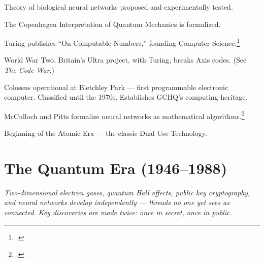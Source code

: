 \begin{description}[style=nextline, leftmargin=3.5cm, labelwidth=3cm]

\item[1873--98] Theory of biological neural networks proposed and experimentally tested.

\item[1924--1927] The Copenhagen Interpretation of Quantum Mechanics is formalized.

\item[1936] Turing publishes ``On Computable Numbers,'' founding Computer Science.\footcite{turing1936}

\item[1939--1945] World War Two. Britain's Ultra project, with Turing, breaks Axis codes. (See \textit{The Code War}.)

\item[1943] Colossus operational at Bletchley Park --- first programmable electronic computer. Classified until the 1970s. Establishes GCHQ's computing heritage.

\item[1943] McCulloch and Pitts formalize neural networks as mathematical algorithms.\footcite{mccullochpitts1943}

\item[1945] Beginning of the Atomic Era --- the classic Dual Use Technology.

\end{description}

\section*{The Quantum Era (1946--1988)}

\textit{Two-dimensional electron gases, quantum Hall effects, public key cryptography, and neural networks develop independently --- threads no one yet sees as connected. Key discoveries are made twice: once in secret, once in public.}

\vspace{0.3cm}

